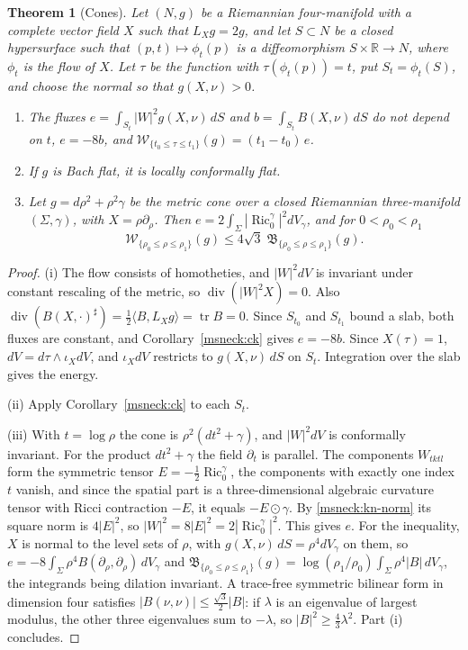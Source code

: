 \documentclass[11pt]{article}
\numberwithin{equation}{section}
\newtheorem{theorem}{Theorem}[section]
\theoremstyle{definition}
\theoremstyle{remark}
\DeclareMathOperator{\Ric}{Ric}
\DeclareMathOperator{\tr}{tr}
\begin{document}
\begin{theorem}[Cones]\label{msneck:cones}
Let \((N,g)\) be a Riemannian four-manifold with a complete vector field
\(X\) such that \(L_Xg=2g\), and let \(S\subset N\) be a closed
hypersurface such that \((p,t)\mapsto\phi_t(p)\) is a diffeomorphism
\(S\times\mathbb R\to N\), where \(\phi_t\) is the flow of \(X\). Let
\(\tau\) be the function with \(\tau(\phi_t(p))=t\), put
\(S_t=\phi_t(S)\), and choose the normal so that \(g(X,\nu)>0\).
\begin{enumerate}[label=\textup{(\roman*)}]
\item The fluxes \(e=\int_{S_t}|W|^2g(X,\nu)\,dS\) and
\(b=\int_{S_t}B(X,\nu)\,dS\) do not depend on \(t\), \(e=-8b\), and
\(\mathcal W_{\{t_0\le\tau\le t_1\}}(g)=(t_1-t_0)\,e\).
\item If \(g\) is Bach flat, it is locally conformally flat.
\item Let \(g=d\rho^2+\rho^2\gamma\) be the metric cone over a closed
Riemannian three-manifold \((\Sigma,\gamma)\), with \(X=\rho\partial_\rho\).
Then \(e=2\int_\Sigma|\Ric_0^\gamma|^2dV_\gamma\), and for \(0<\rho_0<\rho_1\)
\[
 \mathcal W_{\{\rho_0\le\rho\le\rho_1\}}(g)\le4\sqrt3\;
 \mathfrak B_{\{\rho_0\le\rho\le\rho_1\}}(g).
\]
\end{enumerate}
\end{theorem}

\begin{proof}
(i) The flow consists of homotheties, and \(|W|^2dV\) is invariant under
constant rescaling of the metric, so \(\operatorname{div}(|W|^2X)=0\).
Also \(\operatorname{div}(B(X,\cdot)^\sharp)=\tfrac12\langle B,L_Xg\rangle
=\tr B=0\). Since \(S_{t_0}\) and \(S_{t_1}\) bound a slab, both fluxes are
constant, and Corollary~\ref{msneck:ck} gives \(e=-8b\). Since \(X(\tau)=1\),
\(dV=d\tau\wedge\iota_XdV\), and \(\iota_XdV\) restricts to \(g(X,\nu)\,dS\)
on \(S_t\). Integration over the slab gives the energy.

(ii) Apply Corollary~\ref{msneck:ck} to each \(S_t\).

(iii) With \(t=\log\rho\) the cone is \(\rho^2(dt^2+\gamma)\), and
\(|W|^2dV\) is conformally invariant. For the product \(dt^2+\gamma\) the
field \(\partial_t\) is parallel. The components \(W_{tktl}\) form the
symmetric tensor \(E=-\tfrac12\Ric_0^\gamma\), the components with exactly
one index \(t\) vanish, and since the spatial part is a three-dimensional
algebraic curvature tensor with Ricci contraction \(-E\), it equals
\(-E\odot\gamma\). By \eqref{msneck:kn-norm} its square norm is
\(4|E|^2\), so \(|W|^2=8|E|^2=2|\Ric_0^\gamma|^2\). This gives \(e\). For
the inequality, \(X\) is normal to the level sets of \(\rho\), with
\(g(X,\nu)\,dS=\rho^4dV_\gamma\) on them, so
\(e=-8\int_\Sigma\rho^4B(\partial_\rho,\partial_\rho)\,dV_\gamma\) and
\(\mathfrak B_{\{\rho_0\le\rho\le\rho_1\}}(g)=\log(\rho_1/\rho_0)
\int_\Sigma\rho^4|B|\,dV_\gamma\), the integrands being dilation invariant.
A trace-free symmetric bilinear form in dimension four satisfies
\(|B(\nu,\nu)|\le\tfrac{\sqrt3}2|B|\): if \(\lambda\) is an eigenvalue of
largest modulus, the other three eigenvalues sum to \(-\lambda\), so
\(|B|^2\ge\tfrac43\lambda^2\). Part (i) concludes.
\end{proof}
\end{document}
